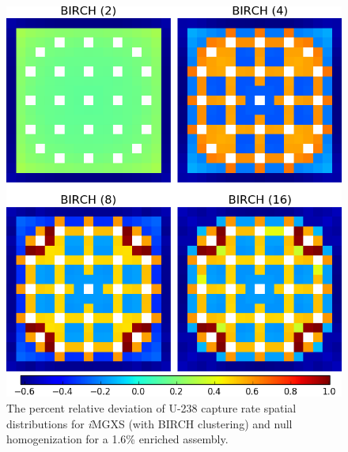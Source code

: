 \begin{figure}[h!]
\centering
\includegraphics[width=0.9\linewidth]{figures/results/compare/assm-16/compare-capt}
\vspace{2mm}
\caption[U-238 capture rate \textit{i}MGXS-to-null relative deviations]{The percent relative deviation of U-238 capture rate spatial distributions for \textit{i}\ac{MGXS} (with BIRCH clustering) and null homogenization for a 1.6\% enriched assembly.}
\label{fig:chap11-assm-1.6-capt-rates-comp}
\end{figure}

\clearpage

